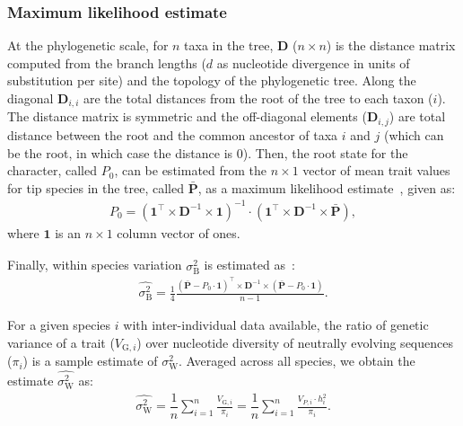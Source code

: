 \documentclass{article}
\newcommand{\Multiply}{\cdot}
\newcommand{\MultiplyMatrix}{\times}
\newcommand{\UniDimArray}[1]{\bm{#1}}
\newcommand{\BiDimArray}[1]{\bm{#1}}
\newcommand{\tr}{^{\intercal}}
\newcommand{\inv}{^{-1}}
\newcommand{\Spi}{i}
\newcommand{\Spj}{j}
\newcommand{\NbrTaxa}{n}
\newcommand{\Trait}{P}
\newcommand{\Heritability}{h^2}
\newcommand{\VecTrait}{\UniDimArray{\bar{\Trait}}}
\newcommand{\Root}{0}
\newcommand{\RootTrait}{\Trait_{\Root}}
\newcommand{\VecOne}{\UniDimArray{1}}
\newcommand{\Distance}{\BiDimArray{D}}
\newcommand{\DistanceMatrix}{\BiDimArray{\Distance}}
\newcommand{\VarGeneticSpi}{V_{\mathrm{G}, \Spi}}
\newcommand{\RateBetween}{\sigma^2_{\mathrm{B}}}
\newcommand{\RateWhithin}{\sigma^2_{\mathrm{W}}}
\newcommand{\EstRateBetween}{\widehat{\RateBetween}}
\newcommand{\EstRateWhithin}{\widehat{\RateWhithin}}
\begin{document}
\subsubsection*{Maximum likelihood estimate}
At the phylogenetic scale, for $\NbrTaxa$ taxa in the tree, $\DistanceMatrix$ ($\NbrTaxa \times \NbrTaxa$) is the distance matrix computed from the branch lengths ($d$ as nucleotide divergence in units of substitution per site) and the topology of the phylogenetic tree.
Along the diagonal $\Distance_{\Spi,\Spi}$ are the total distances from the root of the tree to each taxon ($\Spi$).
The distance matrix is symmetric and the off-diagonal elements ($\Distance_{\Spi,\Spj}$) are total distance between the root and the common ancestor of taxa $\Spi$ and $\Spj$ (which can be the root, in which case the distance is 0).
Then, the root state for the character, called $\RootTrait$, can be estimated from the $\NbrTaxa \times 1$ vector of mean trait values for tip species in the tree, called $\VecTrait$, as a maximum likelihood estimate~\cite{omeara_testing_2006}, given as:
\begin{gather}
    \RootTrait = \left( \VecOne\tr \MultiplyMatrix \DistanceMatrix\inv \MultiplyMatrix \VecOne \right)\inv \Multiply \left( \VecOne\tr \MultiplyMatrix \DistanceMatrix\inv \MultiplyMatrix \VecTrait \right), \label{eq:estimated-root-trait}
\end{gather}
where $\VecOne$ is an $\NbrTaxa \times 1$ column vector of ones.

Finally, within species variation $\EstRateBetween$ is estimated as~\cite{omeara_testing_2006}:
\begin{gather}
    \EstRateBetween = \frac{1}{4}\frac{\left( \VecTrait -  \RootTrait \Multiply \VecOne \right)\tr \MultiplyMatrix \DistanceMatrix\inv \MultiplyMatrix \left( \VecTrait -  \RootTrait \Multiply \VecOne  \right)}{\NbrTaxa - 1}. \label{eq:estimated-rate-phy}
\end{gather}

For a given species $\Spi$ with inter-individual data available, the ratio of genetic variance of a trait ($\VarGeneticSpi$) over nucleotide diversity of neutrally evolving sequences ($\pi_{\Spi}$) is a sample estimate of $\RateWhithin$.
Averaged across all species, we obtain the estimate $\EstRateWhithin$ as:
\begin{gather}
    \EstRateWhithin = \dfrac{1}{\NbrTaxa}\sum_{i=1}^{\NbrTaxa}\frac{  \VarGeneticSpi}{ \pi_{i}} = \dfrac{1}{\NbrTaxa}\sum_{i=1}^{\NbrTaxa} \frac{  V_{\Trait, i} \Multiply \Heritability_{i}}{ \pi_{i}}. \label{eq:estimated-rate-pop}
\end{gather}
\end{document}
